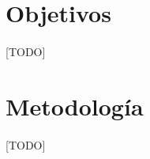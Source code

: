 \documentclass{subfiles}
\begin{document}
    \section{Objetivos}
    \label{sec:introduction_objectives}

      \paragraph{}
      [TODO]

    \section{Metodología}
    \label{sec:introduction_metodology}

      \paragraph{}
      [TODO]
\end{document}
